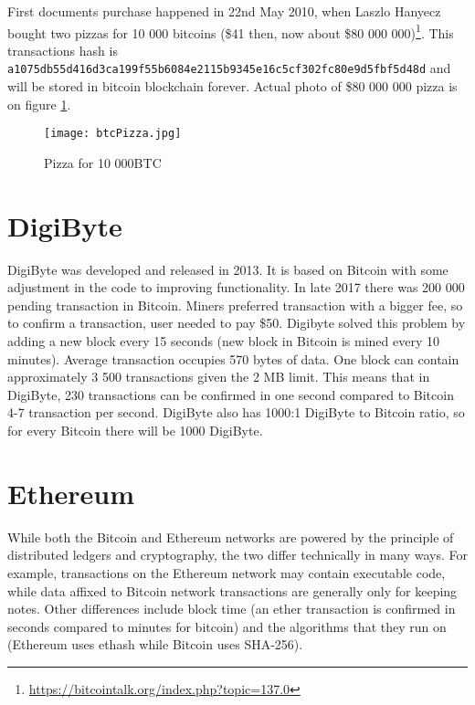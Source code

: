 First documents purchase happened in 22nd May 2010, when Laszlo Hanyecz bought two pizzas for 10 000 bitcoins (\$41 then, now about \$80 000 000)\footnote{\url{https://bitcointalk.org/index.php?topic=137.0}}. This transactions hash is \texttt{a1075db55d416d3ca199f55b6084e\-2115b9345e16c5cf302fc80e9d5fbf5d48d} and will be stored in bitcoin blockchain forever. Actual photo of \$80 000 000 pizza is on figure \ref{bitcoinPizza}. 

\begin{figure}[h]
    \centering
    \texttt{[image: btcPizza.jpg]}
    \caption{Pizza for 10 000BTC}
    \label{bitcoinPizza}
\end{figure}


\section{DigiByte}
DigiByte was developed and released in 2013. It is based on Bitcoin with some adjustment in the code to improving functionality. In late 2017 there was 200 000 pending transaction in Bitcoin. Miners preferred transaction with a bigger fee, so to confirm a transaction, user needed to pay \$50. Digibyte solved this problem by adding a new block every 15 seconds (new block in Bitcoin is mined every 10 minutes). Average transaction occupies 570 bytes of data. One block can contain approximately 3 500 transactions given the 2 MB limit. This means that in DigiByte, 230 transactions can be confirmed in one second compared to Bitcoin 4-7 transaction per second. DigiByte also has 1000:1 DigiByte to Bitcoin ratio, so for every Bitcoin there will be 1000 DigiByte.\cite{digibyteBook}


\section{Ethereum}
While both the Bitcoin and Ethereum networks are powered by the principle of distributed ledgers and cryptography, the two differ technically in many ways. For example, transactions on the Ethereum network may contain executable code, while data affixed to Bitcoin network transactions are generally only for keeping notes. Other differences include block time (an ether transaction is confirmed in seconds compared to minutes for bitcoin) and the algorithms that they run on (Ethereum uses ethash while Bitcoin uses SHA-256).\cite{wood2014ethereum}



